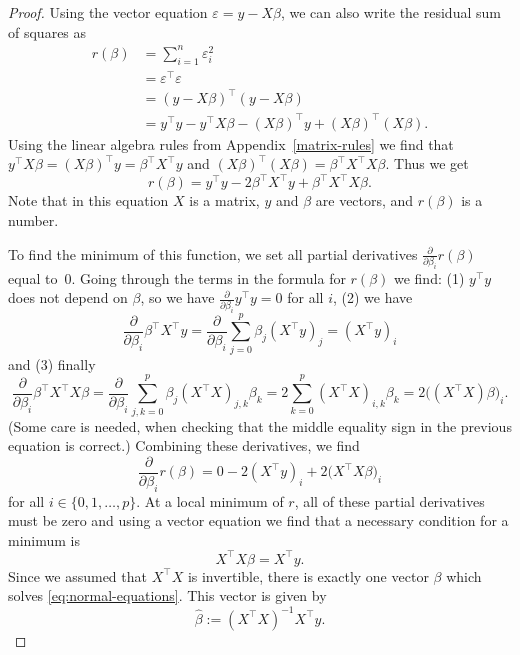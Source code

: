 \documentclass[
  a4paper,
]{article}
\theoremstyle{definition}
\theoremstyle{definition}
\theoremstyle{definition}
\theoremstyle{definition}
\theoremstyle{remark}
\begin{document}
\begin{proof}
Using the vector equation \(\varepsilon= y - X \beta\), we can also write the
residual sum of squares as
\begin{align*}
    r(\beta)
    &= \sum_{i=1}^n \varepsilon_i^2 \\
    &= \varepsilon^\top \varepsilon\\
    &= (y - X \beta)^\top (y - X \beta) \\
    &= y^\top y - y^\top X\beta - (X\beta)^\top y + (X\beta)^\top (X\beta).
  \end{align*}
Using the linear algebra rules from Appendix~\ref{matrix-rules} we find
that \(y^\top X\beta = (X\beta)^\top y = \beta^\top X^\top y\)
and \((X\beta)^\top (X\beta) = \beta^\top X^\top X \beta\). Thus we get
\begin{equation*}
    r(\beta)
    = y^\top y - 2\beta^\top X^\top y + \beta^\top X^\top X \beta.
  \end{equation*}
Note that in this equation \(X\) is a matrix, \(y\) and \(\beta\) are vectors,
and \(r(\beta)\) is a number.

To find the minimum of this function, we set all partial derivatives
\(\frac{\partial}{\partial \beta_i} r(\beta)\) equal to~\(0\). Going through the terms in
the formula for \(r(\beta)\) we find: (1) \(y^\top y\) does not depend on \(\beta\),
so we have \(\frac{\partial}{\partial \beta_i} y^\top y = 0\) for all \(i\), (2) we have
\begin{equation*}
    \frac{\partial}{\partial \beta_i} \beta^\top X^\top y
    = \frac{\partial}{\partial \beta_i} \sum_{j=0}^p \beta_j (X^\top y)_j
    = (X^\top y)_i
  \end{equation*}
and (3) finally
\begin{equation*}
    \frac{\partial}{\partial \beta_i} \beta^\top X^\top X \beta
    = \frac{\partial}{\partial \beta_i} \sum_{j,k=0}^p \beta_j (X^\top X)_{j,k} \beta_k
    = 2 \sum_{k=0}^p (X^\top X)_{i,k} \beta_k
    = 2 \bigl( (X^\top X) \beta \bigr)_i.
  \end{equation*}
(Some care is needed, when checking that the middle equality sign in
the previous equation is correct.)
Combining these derivatives, we find
\begin{equation}
    \frac{\partial}{\partial \beta_i} r(\beta)
    = 0 - 2 (X^\top y)_i + 2 \bigl( X^\top X \beta \bigr)_i
                           \label{eq:normal-first}
  \end{equation}
for all \(i \in \{0, 1, \ldots, p\}\). At a local minimum of \(r\),
all of these partial derivatives must be zero and using a vector
equation we find that a necessary condition for a minimum is
\begin{equation}
    X^\top X \beta = X^\top y.  \label{eq:normal-equations}
  \end{equation}
Since we assumed that \(X^\top X\) is invertible, there is exactly
one vector \(\beta\) which solves \eqref{eq:normal-equations}. This
vector is given by
\begin{equation*}
    \hat\beta
    := (X^\top X)^{-1} X^\top y.
  \end{equation*}


\end{proof}
\end{document}
